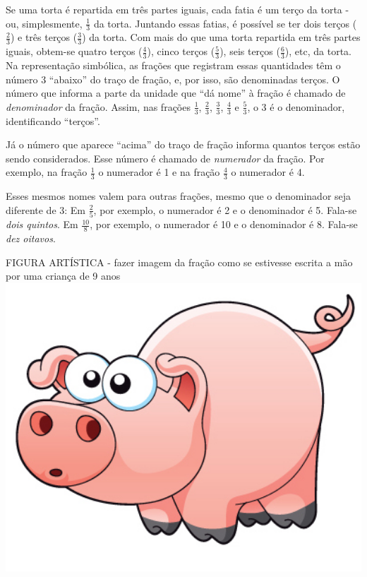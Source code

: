 \documentclass[a4,12pt]{book}
\begin{document}
Se uma torta é repartida em três partes iguais, cada fatia é um terço da torta - ou, simplesmente, $\frac{1}{3}$ da torta. Juntando essas fatias, é possível se ter dois terços ($\frac{2}{3}$) e três terços ($\frac{3}{3}$) da torta. Com mais do que uma torta repartida em três partes iguais, obtem-se quatro terços ($\frac{4}{3}$), cinco terços ($\frac{5}{3}$), seis terços ($\frac{6}{3}$), etc, da torta. Na representação simbólica, as frações que registram essas quantidades têm o número 3 ``abaixo'' do traço de fração, e, por isso, são denominadas terços. O número que informa a parte da unidade que ``dá nome'' à fração é chamado de {\it denominador} da fração. Assim, nas frações $\frac{1}{3}$, $\frac{2}{3}$, $\frac{3}{3}$,  $\frac{4}{3}$ e $\frac{5}{3}$, o 3 é o denominador, identificando ``terços''. 


Já o número que aparece ``acima'' do traço de fração informa quantos terços estão sendo considerados. Esse número é chamado de {\it numerador} da fração. Por exemplo, na fração $\frac{1}{3}$ o numerador é 1 e na fração $\frac{4}{3}$ o numerador é 4.

Esses mesmos nomes valem para outras frações, mesmo que o denominador seja diferente de 3:\mbox{} \newline 
Em $\frac{2}{5}$, por exemplo, o numerador é 2 e o denominador é 5. Fala-se {\it dois quintos}.\mbox{} \newline 
Em $\frac{10}{8}$, por exemplo, o numerador é 10 e o denominador é 8. Fala-se {\it dez oitavos}. 




\begin{imagem*}[breakable]{}{}   FIGURA ARTÍSTICA - fazer imagem da fração como se estivesse escrita a mão por uma criança de 9 anos   \mbox{} \newline        \includegraphics[width=480pt, keepaspectratio]{pig}   \end{imagem*}
\end{document}
